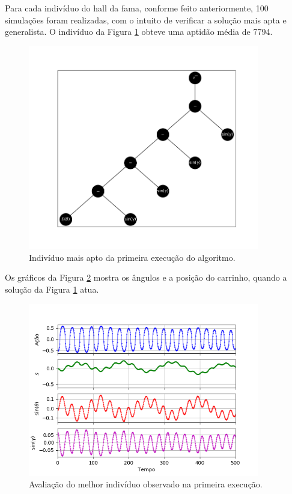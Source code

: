 Para cada indivíduo do hall da fama, conforme feito anteriormente, 100 simulações foram realizadas, com o intuito de verificar a solução mais apta e generalista. O indivíduo da Figura \ref{fig:4ec-dpindiv1} obteve uma aptidão média de 7794.

\begin{figure}[H]
	\centering
	\includegraphics[width=0.9\textwidth]{02_desenvolvimento/04_EC_Fig_DPIndiv1}
	\caption{Indivíduo mais apto da primeira execução do algoritmo.}
	\label{fig:4ec-dpindiv1}
\end{figure}

Os gráficos da Figura \ref{fig:4ec-dpvargraf} mostra os ângulos e a posição do carrinho, quando a solução da Figura \ref{fig:4ec-dpindiv1} atua. 

\begin{figure}[H]
	\centering
	\includegraphics[width=0.9\textwidth]{02_desenvolvimento/04_EC_Fig_DPVarGraf}
	\caption{Avaliação do melhor indivíduo observado na primeira execução.}
	\label{fig:4ec-dpvargraf}
\end{figure}























